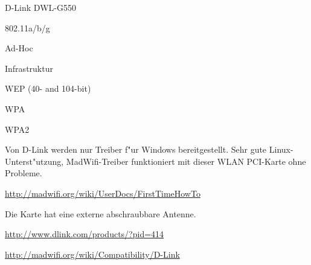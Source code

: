 %
%
\begin{wlandevice}{D-Link DWL-G550}



\begin{wlanieeestandard}
\item 802.11a/b/g
\end{wlanieeestandard}

\begin{wlanmode}
\item Ad-Hoc
\item Infrastruktur
\end{wlanmode}

\begin{wlansecurity}
\item WEP (40- and 104-bit)
\item WPA
\item WPA2
\end{wlansecurity}

\begin{wlandriver}
\item
Von D-Link werden nur Treiber f"ur Windows bereitgestellt. Sehr gute Linux-
Unterst"utzung, MadWifi-Treiber funktioniert mit dieser WLAN PCI-Karte
ohne Probleme.
\end{wlandriver}


\begin{wlaninstall}
\item \url{http://madwifi.org/wiki/UserDocs/FirstTimeHowTo}
\end{wlaninstall}

\begin{wlanextrainfo}
\item
Die Karte hat eine externe abschraubbare Antenne.
\end{wlanextrainfo}

\begin{wlanlink}
\item \url{http://www.dlink.com/products/?pid=414}
\item \url{http://madwifi.org/wiki/Compatibility/D-Link}
\end{wlanlink}

\end{wlandevice}

